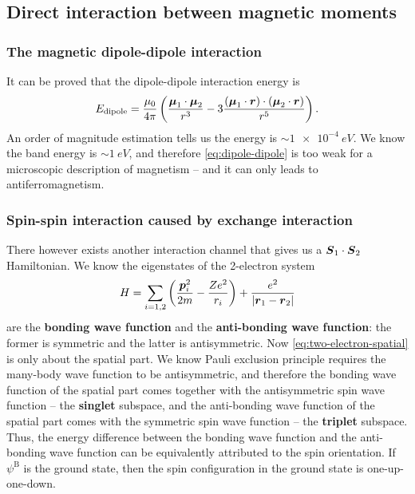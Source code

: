 \documentclass[hyperref, a4paper]{article}
\newcommand*{\concept}[1]{{\textbf{#1}}}
\begin{document}
\subsection{Direct interaction between magnetic moments}

\subsubsection{The magnetic dipole-dipole interaction}\label{sec:localized.heisenberg.dipole}

It can be proved that the dipole-dipole interaction energy is 
\begin{equation}
    E_{\text{dipole}} = 
    \frac{\mu_0}{4\pi}
    \left(
        \frac{\vb*{\mu}_1 \cdot \vb*{\mu}_2}{r^3}
        - 3 \frac{(\vb*{\mu}_1 \cdot \vb*{r}) \cdot (\vb*{\mu}_2 \cdot \vb*{r})}{r^5}
    \right).
    \label{eq:dipole-dipole}
\end{equation}
An order of magnitude estimation tells us the energy is $\sim \SI{1e-4}{eV}$.
We know the band energy is $\sim \SI{1}{eV}$,
and therefore \eqref{eq:dipole-dipole} is too weak
for a microscopic description of magnetism -- 
and it can only leads to antiferromagnetism.

\subsubsection{Spin-spin interaction caused by exchange interaction}

There however exists another interaction channel 
that gives us a $\vb*{S}_1 \cdot \vb*{S}_2$ Hamiltonian.
We know the eigenstates of the 2-electron system 
\begin{equation}
    H = \sum_{i = 1,2 } \left(
        \frac{\vb*{p}_i^2}{2m} - \frac{Z e^2}{r_i}
    \right)
    + \frac{e^2}{\abs{\vb*{r}_1 - \vb*{r}_2}}   
    \label{eq:two-electron-spatial}
\end{equation}
are the \concept{bonding wave function} and the \concept{anti-bonding wave function}:
the former is symmetric and the latter is antisymmetric.
Now \eqref{eq:two-electron-spatial} is only about the spatial part.
We know Pauli exclusion principle requires the many-body wave function 
to be antisymmetric,
and therefore the bonding wave function of the spatial part 
comes together with the antisymmetric spin wave function -- the \concept{singlet} subspace,
and the anti-bonding wave function of the spatial part 
comes with the symmetric spin wave function -- the \concept{triplet} subspace.
Thus, the energy difference between the bonding wave function and the anti-bonding wave function 
can be equivalently attributed to the spin orientation.
If $\psi^\text{B}$ is the ground state, 
then the spin configuration in the ground state is one-up-one-down.
\end{document}
